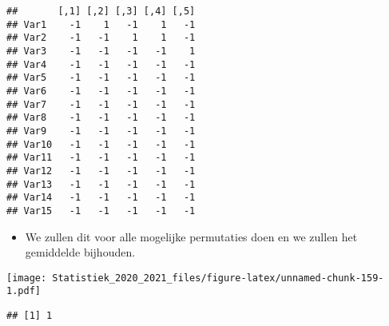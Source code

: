 \documentclass[
  12pt,dutch,coursenotes]{book}
\newenvironment{Shaded}{\begin{snugshade}}{\end{snugshade}}
\newcommand{\CommentTok}[1]{\textcolor[rgb]{0.56,0.35,0.01}{\textit{#1}}}
\newcommand{\DataTypeTok}[1]{\textcolor[rgb]{0.13,0.29,0.53}{#1}}
\newcommand{\KeywordTok}[1]{\textcolor[rgb]{0.13,0.29,0.53}{\textbf{#1}}}
\newcommand{\NormalTok}[1]{#1}
\newcommand{\OperatorTok}[1]{\textcolor[rgb]{0.81,0.36,0.00}{\textbf{#1}}}
\newcommand{\StringTok}[1]{\textcolor[rgb]{0.31,0.60,0.02}{#1}}
\providecommand{\tightlist}{%
  \setlength{\itemsep}{0pt}\setlength{\parskip}{0pt}}
\theoremstyle{definition}
\theoremstyle{definition}
\theoremstyle{definition}
\theoremstyle{remark}
\begin{document}
\begin{verbatim}
##       [,1] [,2] [,3] [,4] [,5]
## Var1    -1    1   -1    1   -1
## Var2    -1   -1    1    1   -1
## Var3    -1   -1   -1   -1    1
## Var4    -1   -1   -1   -1   -1
## Var5    -1   -1   -1   -1   -1
## Var6    -1   -1   -1   -1   -1
## Var7    -1   -1   -1   -1   -1
## Var8    -1   -1   -1   -1   -1
## Var9    -1   -1   -1   -1   -1
## Var10   -1   -1   -1   -1   -1
## Var11   -1   -1   -1   -1   -1
## Var12   -1   -1   -1   -1   -1
## Var13   -1   -1   -1   -1   -1
## Var14   -1   -1   -1   -1   -1
## Var15   -1   -1   -1   -1   -1
\end{verbatim}

\begin{itemize}
\tightlist
\item
  We zullen dit voor alle mogelijke permutaties doen en we zullen het gemiddelde bijhouden.
\end{itemize}

\begin{Shaded}
\end{Shaded}

\texttt{[image: Statistiek\_2020\_2021\_files/figure-latex/unnamed-chunk-159-1.pdf]}

\begin{Shaded}
\end{Shaded}

\begin{verbatim}
## [1] 1
\end{verbatim}
\end{document}
